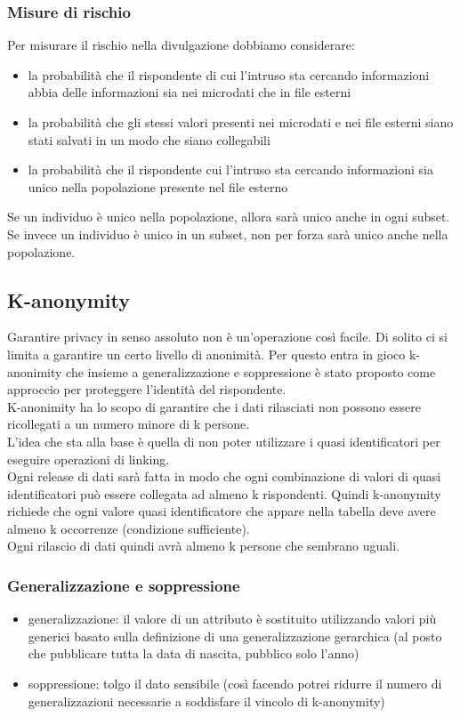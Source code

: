 \subsubsection{Misure di rischio}
Per misurare il rischio nella divulgazione dobbiamo considerare:
\begin{itemize}
    \item la probabilità che il rispondente di cui l'intruso sta cercando informazioni abbia delle informazioni sia nei microdati che in file esterni
    \item la probabilità che gli stessi valori presenti nei microdati e nei file esterni siano stati salvati in un modo che siano collegabili
    \item la probabilità che il rispondente cui l'intruso sta cercando informazioni sia unico nella popolazione presente nel file esterno
\end{itemize}
Se un individuo è unico nella popolazione, allora sarà unico anche in ogni subset. Se invece un individuo è unico in un subset, non per forza sarà unico anche nella popolazione.

\subsection{K-anonymity}
Garantire privacy in senso assoluto non è un'operazione così facile. Di solito ci si limita a garantire un certo livello di anonimità. Per questo entra in gioco k-anonimity che insieme a generalizzazione e soppressione è stato proposto come approccio per proteggere l'identità del rispondente.\\
K-anonimity ha lo scopo di garantire che i dati rilasciati non possono essere ricollegati a un numero minore di k persone.\\ L'idea che sta alla base è quella di non poter utilizzare i quasi identificatori per eseguire operazioni di linking. \\
Ogni release di dati sarà fatta in modo che ogni combinazione di valori di quasi identificatori può essere collegata ad almeno k rispondenti. Quindi k-anonymity richiede che ogni valore quasi identificatore che appare nella tabella deve avere almeno k occorrenze (condizione sufficiente).\\
Ogni rilascio di dati quindi avrà almeno k persone che sembrano uguali.
\subsubsection{Generalizzazione e soppressione}
\begin{itemize}
    \item generalizzazione: il valore di un attributo è sostituito utilizzando valori più generici basato sulla definizione di una generalizzazione gerarchica (al posto che pubblicare tutta la data di nascita, pubblico solo l'anno)
    \item soppressione: tolgo il dato sensibile (così facendo potrei ridurre il numero di generalizzazioni necessarie a soddisfare il vincolo di k-anonymity)
\end{itemize}

